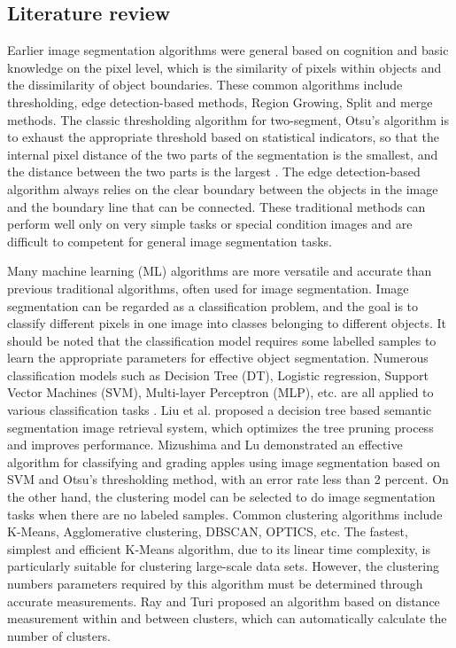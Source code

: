 \documentclass[12pt, a4paper]{article}
\begin{document}
\begin{multicols}{2}
	\section{Literature review} \justify
	Earlier image segmentation algorithms were general based on cognition and basic knowledge on the pixel level, which is the similarity of pixels within objects and the dissimilarity of object boundaries. These common algorithms include thresholding, edge detection-based methods, Region Growing, Split and merge methods. The classic thresholding algorithm for two-segment, Otsu's algorithm is to exhaust the appropriate threshold based on statistical indicators, so that the internal pixel distance of the two parts of the segmentation is the smallest, and the distance between the two parts is the largest \cite{otsu1979threshold}. The edge detection-based algorithm always relies on the clear boundary between the objects in the image and the boundary line that can be connected. These traditional methods can perform well only on very simple tasks or special condition images and are difficult to competent for general image segmentation tasks.
	\par 	
	Many machine learning (ML) algorithms are more versatile and accurate than previous traditional algorithms, often used for image segmentation. Image segmentation can be regarded as a classification problem, and the goal is to classify different pixels in one image into classes belonging to different objects. It should be noted that the classification model requires some labelled samples to learn the appropriate parameters for effective object segmentation. Numerous classification models such as Decision Tree (DT), Logistic regression, Support Vector Machines (SVM), Multi-layer Perceptron (MLP), etc. are all applied to various classification tasks \cite{pedregosa2011scikit}. Liu et al. \cite{liu2006region} proposed a decision tree based semantic segmentation image retrieval system, which optimizes the tree pruning process and improves performance. Mizushima and Lu \cite{mizushima2013image} demonstrated an effective algorithm for classifying and grading apples using image segmentation based on SVM and Otsu’s thresholding method, with an error rate less than 2 percent. On the other hand, the clustering model can be selected to do image segmentation tasks when there are no labeled samples. Common clustering algorithms include K-Means, Agglomerative clustering, DBSCAN, OPTICS, etc. The fastest, simplest and efficient K-Means algorithm, due to its linear time complexity, is particularly suitable for clustering large-scale data sets. However, the clustering numbers parameters required by this algorithm must be determined through accurate measurements. Ray and Turi \cite{ray1999determination} proposed an algorithm based on distance measurement within and between clusters, which can automatically calculate the number of clusters.

\end{multicols}
\end{document}
